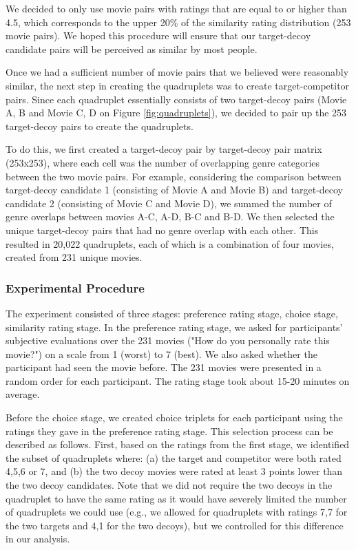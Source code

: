 \documentclass[12pt, a4paper]{article}
\begin{document}
We decided to only use movie pairs with ratings that are equal to or higher than 4.5, which corresponds to the upper 20\% of the similarity rating distribution (253 movie pairs). We hoped this procedure will ensure that our target-decoy candidate pairs will be perceived as similar by most people. 

Once we had a sufficient number of movie pairs that we believed were reasonably similar, the next step in creating the quadruplets was to create target-competitor pairs. Since each quadruplet essentially consists of two target-decoy pairs (Movie A, B and Movie C, D on Figure \ref{fig:quadruplets}), we decided to pair up the 253 target-decoy pairs to create the quadruplets. 

To do this, we first created a target-decoy pair by target-decoy pair matrix (253x253), where each cell was the number of overlapping genre categories between the two movie pairs. For example, considering the comparison between target-decoy candidate 1 (consisting of Movie A and Movie B) and target-decoy candidate 2 (consisting of Movie C and Movie D), we summed the number of genre overlaps between movies A-C, A-D, B-C and B-D. We then selected the unique target-decoy pairs that had no genre overlap with each other. This resulted in 20,022 quadruplets, each of which is a combination of four movies, created from 231 unique movies.

\subsubsection{Experimental Procedure}

The experiment consisted of three stages: preference rating stage, choice stage, similarity rating stage. In the preference rating stage, we asked for participants' subjective evaluations over the 231 movies ("How do you personally rate this movie?") on a scale from 1 (worst) to 7 (best). We also asked whether the participant had seen the movie before. The 231 movies were presented in a random order for each participant. The rating stage took about 15-20 minutes on average.

Before the choice stage, we created choice triplets for each participant using the ratings they gave in the preference rating stage. This selection process can be described as follows. First, based on the ratings from the first stage, we identified the subset of quadruplets where: (a) the target and competitor were both rated 4,5,6 or 7, and (b) the two decoy movies were rated at least 3 points lower than the two decoy candidates. Note that we did not require the two decoys in the quadruplet to have the same rating as it would have severely limited the number of quadruplets we could use (e.g., we allowed for quadruplets with ratings 7,7 for the two targets and 4,1 for the two decoys), but we controlled for this difference in our analysis.  
 
\end{document}
